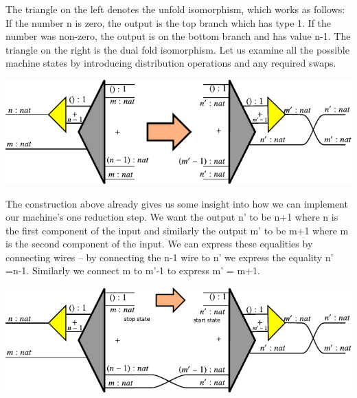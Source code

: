 \documentclass{llncs}
\begin{document}
The triangle on the left denotes the {{unfold}} isomorphism, which
works as follows: If the number {{n}} is zero, the output is the top
branch which has type {{1}}. If the number was non-zero, the output is
on the bottom branch and has value {{n-1}}. The triangle on the right
is the dual {{fold}} isomorphism.  Let us examine all the possible
machine states by introducing distribution operations and any required
swaps.


\begin{center}
  \includegraphics{diagrams/nat-nat4.pdf}
\end{center}

The construction above already gives us some insight into how we can
implement our machine's one reduction step. We want the output {{n'}}
to be {{n+1}} where {{n}} is the first component of the input and
similarly the output {{m'}} to be {{m+1}} where {{m}} is the second
component of the input.  We can express these equalities by connecting
wires -- by connecting the {{n-1}} wire to {{n'}} we express the
equality {{n' =n-1}}. Similarly we connect {{m}} to {{m'-1}} to
express {{m' = m+1}}.

\begin{center}
  \includegraphics{diagrams/nat-nat5.pdf}
\end{center}

\end{document}
